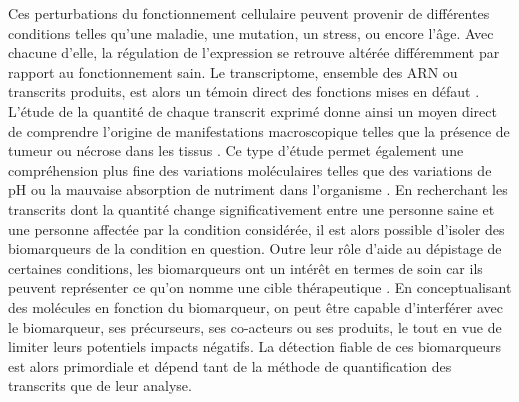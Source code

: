 Ces perturbations du fonctionnement cellulaire peuvent provenir de différentes conditions telles qu'une maladie, une mutation, un stress, ou encore l'âge. Avec chacune d'elle, la régulation de l'expression se retrouve altérée différemment par rapport au fonctionnement sain. Le transcriptome, ensemble des ARN ou transcrits produits, est alors un témoin direct des fonctions mises en défaut \cite{Morozova2009Aug}. L'étude de la quantité de chaque transcrit exprimé donne ainsi un moyen direct de comprendre l'origine de manifestations macroscopique telles que la présence de tumeur ou nécrose dans les tissus \cite{Pennycooke2001Jan,Ahn2018Apr}. Ce type d'étude permet également une compréhension plus fine des variations moléculaires telles que des variations de pH ou la mauvaise absorption de nutriment dans l'organisme \cite{Martin2017Jun,Ventura2020Nov}. En recherchant les transcrits dont la quantité change significativement entre une personne saine et une personne affectée par la condition considérée, il est alors possible d'isoler des biomarqueurs de la condition en question. Outre leur rôle d'aide au dépistage de certaines conditions, les biomarqueurs ont un intérêt en termes de soin car ils peuvent représenter ce qu'on nomme une cible thérapeutique \cite{Collins2017Jan}. En conceptualisant des molécules en fonction du biomarqueur, on peut être capable d'interférer avec le biomarqueur, ses précurseurs, ses co-acteurs ou ses produits, le tout en vue de limiter leurs potentiels impacts négatifs. La détection fiable de ces biomarqueurs est alors primordiale et dépend tant de la méthode de quantification des transcrits que de leur analyse.



